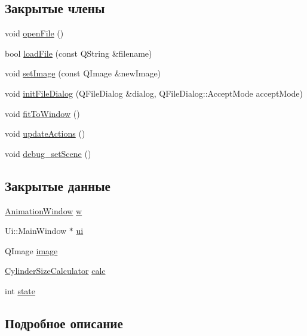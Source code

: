 \subsection*{Закрытые члены}
\begin{DoxyCompactItemize}
\item 
void \hyperlink{class_main_window_a288b768c3c21a9171bdc56fe845ece8b}{open\+File} ()
\item 
bool \hyperlink{class_main_window_a1918d23eda34853c378edf6db1d42e34}{load\+File} (const Q\+String \&filename)
\item 
void \hyperlink{class_main_window_ad1d392c319d9debb466d46d0764ff2d2}{set\+Image} (const Q\+Image \&new\+Image)
\item 
void \hyperlink{class_main_window_a58dcc04f752ebec40b339dc7817b50e4}{init\+File\+Dialog} (Q\+File\+Dialog \&dialog, Q\+File\+Dialog\+::\+Accept\+Mode accept\+Mode)
\item 
void \hyperlink{class_main_window_ab435999eabc5f946c138d920a3196ac9}{fit\+To\+Window} ()
\item 
void \hyperlink{class_main_window_aa2ffe303230bdcd17f4ddeafd222ccad}{update\+Actions} ()
\item 
void \hyperlink{class_main_window_a2cf5c71112c73af4937f1f79eb5723ba}{debug\+\_\+set\+Scene} ()
\end{DoxyCompactItemize}
\subsection*{Закрытые данные}
\begin{DoxyCompactItemize}
\item 
\hyperlink{class_animation_window}{Animation\+Window} \hyperlink{class_main_window_aeb8f8bc8e591c09d7c2bd5d3e4a754dc}{w}
\item 
Ui\+::\+Main\+Window $\ast$ \hyperlink{class_main_window_a35466a70ed47252a0191168126a352a5}{ui}
\item 
Q\+Image \hyperlink{class_main_window_a66a1d5b734bad3d2e9e2db622b9950b4}{image}
\item 
\hyperlink{class_cylinder_size_calculator}{Cylinder\+Size\+Calculator} \hyperlink{class_main_window_ab59b6f62b19d0cd5feef140f71655001}{calc}
\item 
int \hyperlink{class_main_window_aa2b6e7a3cfbc2bffb42aa8c74c37ef2b}{state}
\end{DoxyCompactItemize}


\subsection{Подробное описание}


